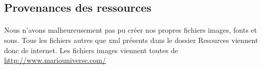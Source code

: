 \subsection{Provenances des ressources}
\paragraph{} Nous n'avons malheureusement pas pu créer nos propres fichiers images, fonts et sons. Tous les fichiers autres que xml présents dans le dossier Resources viennent donc de internet. Les fichiers images viennent toutes de \url{http://www.mariouniverse.com/} 

